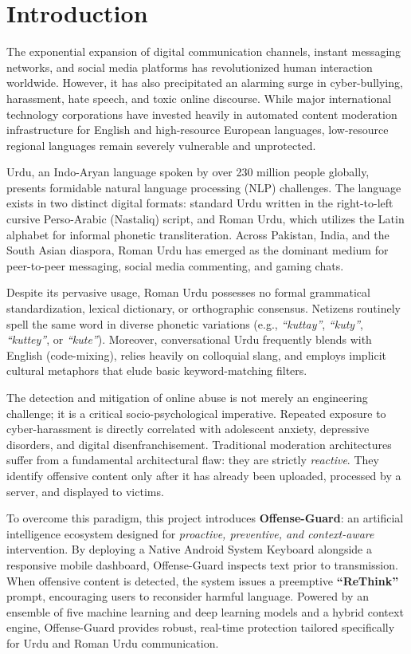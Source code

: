 \documentclass[A4paper,12pt]{report}
\theoremstyle{plain}
\theoremstyle{definition}
\theoremstyle{remark}
\numberwithin{equation}{section}
\begin{document}
\section{Introduction}
The exponential expansion of digital communication channels, instant messaging networks, and social media platforms has revolutionized human interaction worldwide. However, it has also precipitated an alarming surge in cyber-bullying, harassment, hate speech, and toxic online discourse. While major international technology corporations have invested heavily in automated content moderation infrastructure for English and high-resource European languages, low-resource regional languages remain severely vulnerable and unprotected.

Urdu, an Indo-Aryan language spoken by over 230 million people globally, presents formidable natural language processing (NLP) challenges. The language exists in two distinct digital formats: standard Urdu written in the right-to-left cursive Perso-Arabic (Nastaliq) script, and Roman Urdu, which utilizes the Latin alphabet for informal phonetic transliteration. Across Pakistan, India, and the South Asian diaspora, Roman Urdu has emerged as the dominant medium for peer-to-peer messaging, social media commenting, and gaming chats. 

Despite its pervasive usage, Roman Urdu possesses no formal grammatical standardization, lexical dictionary, or orthographic consensus. Netizens routinely spell the same word in diverse phonetic variations (e.g., \textit{``kuttay''}, \textit{``kuty''}, \textit{``kuttey''}, or \textit{``kute''}). Moreover, conversational Urdu frequently blends with English (code-mixing), relies heavily on colloquial slang, and employs implicit cultural metaphors that elude basic keyword-matching filters.

The detection and mitigation of online abuse is not merely an engineering challenge; it is a critical socio-psychological imperative. Repeated exposure to cyber-harassment is directly correlated with adolescent anxiety, depressive disorders, and digital disenfranchisement. Traditional moderation architectures suffer from a fundamental architectural flaw: they are strictly \textit{reactive}. They identify offensive content only after it has already been uploaded, processed by a server, and displayed to victims. 

To overcome this paradigm, this project introduces \textbf{Offense-Guard}: an artificial intelligence ecosystem designed for \textit{proactive, preventive, and context-aware} intervention. By deploying a Native Android System Keyboard alongside a responsive mobile dashboard, Offense-Guard inspects text prior to transmission. When offensive content is detected, the system issues a preemptive \textbf{``ReThink''} prompt, encouraging users to reconsider harmful language. Powered by an ensemble of five machine learning and deep learning models and a hybrid context engine, Offense-Guard provides robust, real-time protection tailored specifically for Urdu and Roman Urdu communication.
\end{document}
